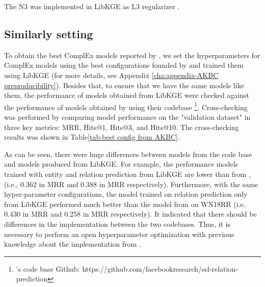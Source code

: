 The N3 was implemented in LibKGE as L3 regularizer \citep{Ruffinelli2020You}.

\subsection{Similarly setting}
To obtain the best ComplEx models reported by \citet{chen2021relation}, we set the hyperparameters for ComplEx models using the best configurations founded by \citet{chen2021relation} and trained them using LibKGE (for more details, see Appendix \ref{cha:appendix-AKBC preproducibility}). Besides that, to ensure that we have the same models like them, the performance of models obtained from LibKGE were checked against the performance of models obtained by using their codebase \footnote{\citet{chen2021relation}'s code base Github: https://github.com/facebookresearch/ssl-relation-prediction}. Cross-checking was performed by comparing model performance on the "validation dataset" in three key metrics: MRR, Hits@1, Hits@3, and Hits@10. The cross-checking results was shown in Table\ref{tab:best config from AKBC}.

As can be seen, there were huge differences between models from the \citet{chen2021relation} code base and models produced from LibKGE. For example, the performance models trained with entity and relation prediction from LibKGE are lower than from \citet{chen2021relation}, (i.e., 0.362 in MRR and 0.388 in MRR respectively). Furthermore, with the same hyper-parameter configurations, the model trained on relation prediction only from LibKGE performed much better than the model from \citet{chen2021relation} on WN18RR (i.e. 0.430 in MRR and 0.258 in MRR respectively). It indicated that there should be differences in the implementation between the two codebases. Thus, it is necessary to perform an open hyperparameter optimization with previous knowledge about the implementation from \citet{chen2021relation}.

